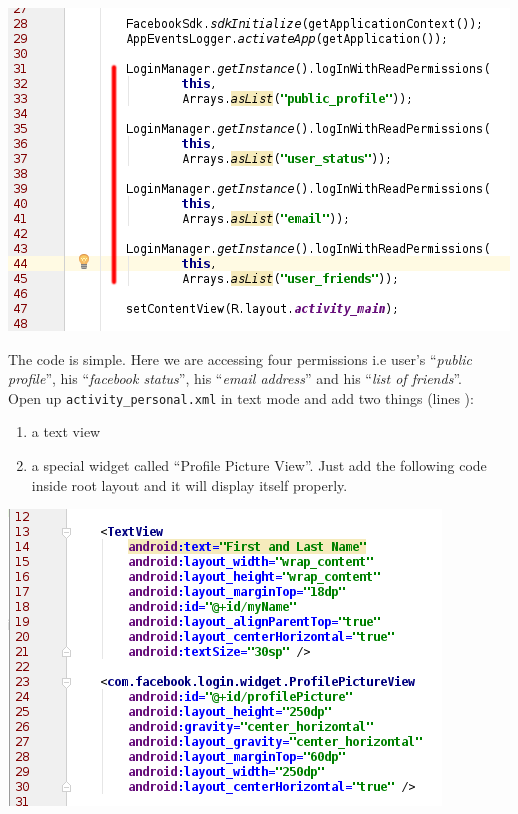 \begin{center}
	\includegraphics[scale=\SourceCodeScale]{chapters/ch12/images/30}
\end{center}

The code is simple. Here we are accessing four permissions i.e user's ``\textit{public profile}'', his ``\textit{facebook status}'', his ``\textit{email address}'' and his ``\textit{list of friends}''. \\

Open up \texttt{activity\_personal.xml} in text mode and add two things (lines ): 
\begin{enumerate}
	\item a text view
	\item a special widget called ``Profile Picture View''. Just add the following code inside root layout and it will display itself properly.
\end{enumerate}

\begin{center}
	\includegraphics[scale=\SourceCodeScale]{chapters/ch12/images/31}
\end{center}

